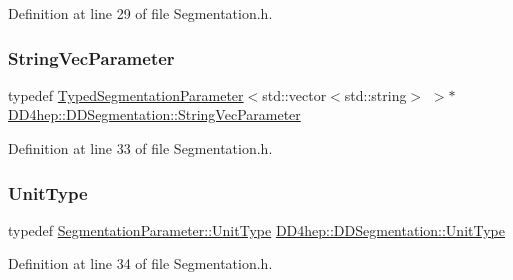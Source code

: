 Definition at line 29 of file Segmentation.\+h.

\hypertarget{namespace_d_d4hep_1_1_d_d_segmentation_a6560c8ed740be64475f81e890aaa58b2}{}\label{namespace_d_d4hep_1_1_d_d_segmentation_a6560c8ed740be64475f81e890aaa58b2} 
\subsubsection{\texorpdfstring{String\+Vec\+Parameter}{StringVecParameter}}
{\footnotesize\ttfamily typedef \hyperlink{class_d_d4hep_1_1_d_d_segmentation_1_1_typed_segmentation_parameter}{Typed\+Segmentation\+Parameter}$<$std\+::vector$<$std\+::string$>$ $>$$\ast$ \hyperlink{namespace_d_d4hep_1_1_d_d_segmentation_a6560c8ed740be64475f81e890aaa58b2}{D\+D4hep\+::\+D\+D\+Segmentation\+::\+String\+Vec\+Parameter}}



Definition at line 33 of file Segmentation.\+h.

\hypertarget{namespace_d_d4hep_1_1_d_d_segmentation_a416c3e3ca0d578410085897700ab29dc}{}\label{namespace_d_d4hep_1_1_d_d_segmentation_a416c3e3ca0d578410085897700ab29dc} 
\subsubsection{\texorpdfstring{Unit\+Type}{UnitType}}
{\footnotesize\ttfamily typedef \hyperlink{class_d_d4hep_1_1_d_d_segmentation_1_1_segmentation_parameter_a36f5f8b8d812b2a2b81363377565d8d4}{Segmentation\+Parameter\+::\+Unit\+Type} \hyperlink{class_d_d4hep_1_1_d_d_segmentation_1_1_segmentation_parameter_a36f5f8b8d812b2a2b81363377565d8d4}{D\+D4hep\+::\+D\+D\+Segmentation\+::\+Unit\+Type}}



Definition at line 34 of file Segmentation.\+h.

\hypertarget{namespace_d_d4hep_1_1_d_d_segmentation_a61a6833a18d1800bdef176595f83e3ba}{}\label{namespace_d_d4hep_1_1_d_d_segmentation_a61a6833a18d1800bdef176595f83e3ba} 
